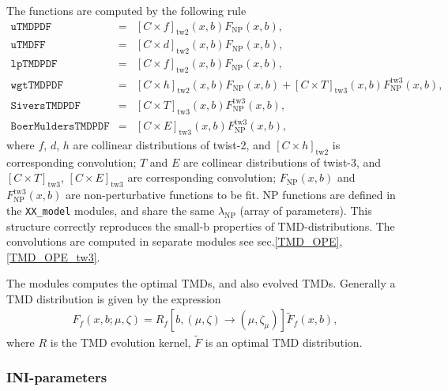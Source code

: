 \documentclass[prd,nofootinbib,eqsecnum,final]{revtex4}
\renewcommand{\(}{\left(}
\renewcommand{\)}{\right)}
\renewcommand{\[}{\left[}
\renewcommand{\]}{\right]}
\begin{document}
The functions are computed by the following rule
\begin{eqnarray}
\texttt{uTMDPDF}&=&[C\times f]_{\text{tw2}}(x,b)F_{\text{NP}}(x,b),
\\
\texttt{uTMDFF}&=&[C\times d]_{\text{tw2}}(x,b)F_{\text{NP}}(x,b),
\\
\texttt{lpTMDPDF}&=&[C\times f]_{\text{tw2}}(x,b)F_{\text{NP}}(x,b),
\\
\texttt{wgtTMDPDF}&=&[C\times h]_{\text{tw2}}(x,b)F_{\text{NP}}(x,b)+[C\times T]_{\text{tw3}}(x,b)F^{\text{tw3}}_{\text{NP}}(x,b),
\\
\texttt{SiversTMDPDF}&=&[C\times T]_{\text{tw3}}(x,b)F^{\text{tw3}}_{\text{NP}}(x,b),
\\
\texttt{BoerMuldersTMDPDF}&=&[C\times E]_{\text{tw3}}(x,b)F^{\text{tw3}}_{\text{NP}}(x,b),
\end{eqnarray}
where $f$, $d$, $h$ are collinear distributions of twist-2, and $[C\times h]_{\text{tw2}}$ is corresponding convolution;
$T$ and $E$ are collinear distributions of twist-3, and $[C\times T]_{\text{tw3}}$, $[C\times E]_{\text{tw3}}$ are corresponding convolution; $F_{\text{NP}}(x,b)$ and $F^{\text{tw3}}_{\text{NP}}(x,b)$ are non-perturbative functions to be fit. NP functions are defined in the \texttt{XX\_model} modules, and share the same $\lambda_{\text{NP}}$ (array of parameters). This structure correctly reproduces the small-b properties of TMD-distributions. The convolutions are computed in separate modules see sec.\ref{TMD_OPE}, \ref{TMD_OPE_tw3}.

The modules computes the optimal TMDs, and also evolved TMDs. Generally a TMD distribution is given by the expression
\begin{eqnarray}\label{TMD:F=RF}
F_f(x,b;\mu,\zeta)=R_f[b,(\mu,\zeta)\to(\mu,\zeta_{\mu})]\tilde F_f(x,b),
\end{eqnarray}
where $R$ is the TMD evolution kernel, $\tilde F$ is an optimal TMD distribution. 

\subsubsection{INI-parameters}
\end{document}
